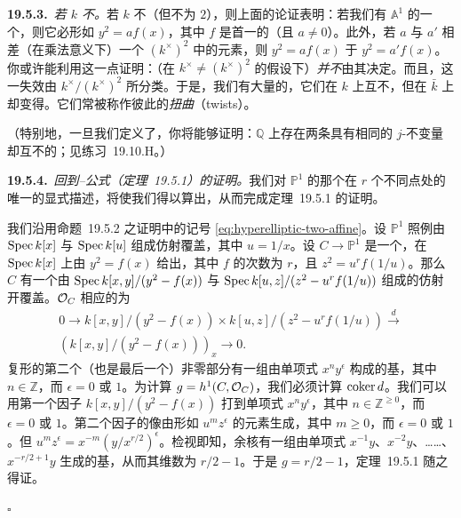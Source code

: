 \textbf{19.5.3.}\ \emph{若 $k$ 不\trAlgClosed。}\quad 若 $k$ 不\trAlgClosed{}（但\trCharacteristic{}不为 $2$），则上面的论证表明：若我们有 $\mathbb{A}^1$ 的一个\trDoubleCover，则它必形如 $y^2=af(x)$，其中 $f$ 是首一的（且 $a\ne 0$）。此外，若 $a$ 与 $a'$ 相差（在乘法意义下）一个 $(k^\times)^2$ 中的元素，则 $y^2=af(x)$ \trIsomorphic{}于 $y^2=a'f(x)$。你或许能利用这一点证明：（在 $k^\times\ne(k^\times)^2$ 的假设下）\trDoubleCover\emph{并不}由其\trBranchPoint{}决定。而且，这一失效由 $k^\times/(k^\times)^2$ 所分类。于是，我们有大量的\trCurve，它们在 $k$ 上互不\trIsomorphic，但在 $\bar{k}$ 上却变得\trIsomorphic。它们常被称作彼此的\emph{扭曲}（twists）。

（特别地，一旦我们定义了\trEllipticCurve，你将能够证明：$\mathbb{Q}$ 上存在两条具有相同的 $j$-不变量却互不\trIsomorphic{}的\trEllipticCurve；见\mbox{练习~19.10.H}。）

\textbf{19.5.4.}\ \emph{回到\trHyperelliptic{}\trRiemann--\trHurwitz{}公式（\mbox{定理~19.5.1}）的证明。}\quad 我们对 $\mathbb{P}^1$ 的那个在 $r$ 个不同点处\trRamification{}的唯一\trDoubleCover{}的显式描述，将使我们得以算出\trGenus，从而完成\mbox{定理~19.5.1} 的证明。

我们沿用\mbox{命题~19.5.2} 之证明中的记号 \eqref{eq:hyperelliptic-two-affine}。设 $\mathbb{P}^1$ 照例由 $\operatorname{Spec} k[x]$ 与 $\operatorname{Spec} k[u]$ 组成仿射覆盖，其中 $u=1/x$。设 $C\to\mathbb{P}^1$ 是一个\trDoubleCover，在 $\operatorname{Spec} k[x]$ 上由 $y^2=f(x)$ 给出，其中 $f$ 的次数为 $r$，且 $z^2=u^rf(1/u)$。那么 $C$ 有一个由 $\operatorname{Spec} k[x,y]/(y^2-f(x))$ 与 $\operatorname{Spec} k[u,z]/(z^2-u^rf(1/u))$ 组成的仿射开覆盖。$\mathcal{O}_C$ 相应的\trCech\trComplexN{}为
\[
\begin{aligned}
0\longrightarrow k[x,y]/(y^2-f(x))\times k[u,z]/(z^2-u^rf(1/u))\overset{d}{\longrightarrow}{}\\
(k[x,y]/(y^2-f(x)))_x\longrightarrow 0.
\end{aligned}
\]
复形的第二个（也是最后一个）非零部分有一组由单项式 $x^ny^\epsilon$ 构成的基，其中 $n\in\mathbb{Z}$，而 $\epsilon=0$ 或 $1$。为计算\trGenus{} $g=h^1(C,\mathcal{O}_C)$，我们必须计算 $\operatorname{coker} d$。我们可以用第一个因子 $k[x,y]/(y^2-f(x))$ 打到单项式 $x^ny^\epsilon$，其中 $n\in\mathbb{Z}^{\ge 0}$，而 $\epsilon=0$ 或 $1$。第二个因子的像由形如 $u^mz^\epsilon$ 的元素生成，其中 $m\ge 0$，而 $\epsilon=0$ 或 $1$。但 $u^mz^\epsilon=x^{-m}(y/x^{r/2})^\epsilon$。检视即知，余核有一组由单项式 $x^{-1}y$、$x^{-2}y$、……、$x^{-r/2+1}y$ 生成的基，从而其维数为 $r/2-1$。于是 $g=r/2-1$，\mbox{定理~19.5.1} 随之得证。

\begin{flushright}
$\square$
\end{flushright}

